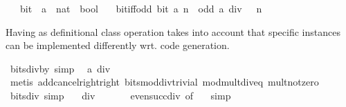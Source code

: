 \begin{isabellebody}
\ \ \ bit\ {\isacharcolon}{\kern0pt}{\isacharcolon}{\kern0pt}\ {\isacartoucheopen}{\isacharprime}{\kern0pt}a\ {\isasymRightarrow}\ nat\ {\isasymRightarrow}\ bool{\isacartoucheclose}\isanewline
\ \ \ bit{\isacharunderscore}{\kern0pt}iff{\isacharunderscore}{\kern0pt}odd{\isacharcolon}{\kern0pt}\ {\isacartoucheopen}bit\ a\ n\ {\isasymlongleftrightarrow}\ odd\ {\isacharparenleft}{\kern0pt}a\ div\ {}\ {\isacharcircum}{\kern0pt}\ n{\isacharparenright}{\kern0pt}{\isacartoucheclose}\isanewline
{}%
\begin{isamarkuptext}%
Having  as definitional class operation
  takes into account that specific instances can be implemented
  differently wrt. code generation.%
\end{isamarkuptext}\isamarkuptrue%
\isamarkupfalse%
\ bits{\isacharunderscore}{\kern0pt}div{\isacharunderscore}{\kern0pt}by{\isacharunderscore}{\kern0pt}{}\ {\isacharbrackleft}{\kern0pt}simp{\isacharbrackright}{\kern0pt}{\isacharcolon}{\kern0pt}\isanewline
\ \ {\isacartoucheopen}a\ div\ {}\ {\isacharequal}{\kern0pt}\ {}{\isacartoucheclose}\isanewline
%
\isadelimproof
\ \ %
\endisadelimproof
%
\isatagproof
{}\isamarkupfalse%
\ {\isacharparenleft}{\kern0pt}metis\ add{\isacharunderscore}{\kern0pt}cancel{\isacharunderscore}{\kern0pt}right{\isacharunderscore}{\kern0pt}right\ bits{\isacharunderscore}{\kern0pt}mod{\isacharunderscore}{\kern0pt}div{\isacharunderscore}{\kern0pt}trivial\ mod{\isacharunderscore}{\kern0pt}mult{\isacharunderscore}{\kern0pt}div{\isacharunderscore}{\kern0pt}eq\ mult{\isacharunderscore}{\kern0pt}not{\isacharunderscore}{\kern0pt}zero{\isacharparenright}{\kern0pt}%
\endisatagproof
{\isafoldproof}%
%
\isadelimproof
\isanewline
%
\endisadelimproof
\isanewline
{}\isamarkupfalse%
\ bits{\isacharunderscore}{\kern0pt}{}{\isacharunderscore}{\kern0pt}div{\isacharunderscore}{\kern0pt}{}\ {\isacharbrackleft}{\kern0pt}simp{\isacharbrackright}{\kern0pt}{\isacharcolon}{\kern0pt}\isanewline
\ \ {\isacartoucheopen}{}\ div\ {}\ {\isacharequal}{\kern0pt}\ {}{\isacartoucheclose}\isanewline
%
\isadelimproof
\ \ %
\endisadelimproof
%
\isatagproof
{}\isamarkupfalse%
\ even{\isacharunderscore}{\kern0pt}succ{\isacharunderscore}{\kern0pt}div{\isacharunderscore}{\kern0pt}{}\ {\isacharbrackleft}{\kern0pt}of\ {}{\isacharbrackright}{\kern0pt}\ \isamarkupfalse%
\ simp%
\endisatagproof

\end{isabellebody}
